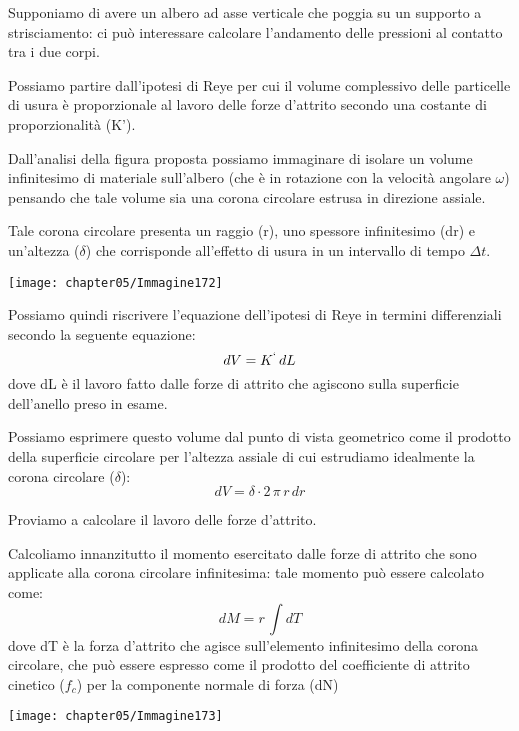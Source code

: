 Supponiamo di avere un albero ad asse verticale che poggia su un supporto a strisciamento: ci può interessare calcolare l'andamento delle pressioni al contatto tra i due corpi.

\begin{minipage}{.65\textwidth}
Possiamo partire dall'ipotesi di Reye per cui il volume complessivo delle particelle di usura è proporzionale al lavoro delle forze d'attrito secondo una costante di proporzionalità (K').

Dall'analisi della figura proposta possiamo immaginare di isolare un volume infinitesimo di materiale sull'albero (che è in rotazione con la velocità angolare $\omega$) pensando che tale volume sia una corona circolare estrusa in direzione assiale.

Tale corona circolare presenta un raggio (r), uno spessore infinitesimo (dr) e un'altezza ($\delta$) che corrisponde all'effetto di usura in un intervallo di tempo $\Delta t$.
\end{minipage}
\hfill
\begin{minipage}{.3\textwidth}
\centering
\texttt{[image: chapter05/Immagine172]}
\end{minipage}

Possiamo quindi riscrivere l'equazione dell'ipotesi di Reye in termini differenziali secondo la seguente equazione:
\[dV = K^{`}\,dL\]
dove dL è il lavoro fatto dalle forze di attrito che agiscono sulla superficie dell'anello preso in esame.

Possiamo esprimere questo volume dal punto di vista geometrico come il prodotto della superficie circolare per l'altezza assiale di cui estrudiamo idealmente la corona circolare ($\delta$):
\[dV = \delta \cdot 2\,\pi\,r\,dr\]

\begin{minipage}{.5\textwidth}
Proviamo a calcolare il lavoro delle forze d'attrito.

Calcoliamo innanzitutto il momento esercitato dalle forze di attrito che sono applicate alla corona circolare infinitesima: tale momento può essere calcolato come:
\[dM = r\,\int dT\]
dove dT è la forza d'attrito che agisce sull'elemento infinitesimo della corona circolare, che può essere espresso come il prodotto del coefficiente di attrito cinetico ($f_c$) per la componente normale di forza (dN)
\end{minipage}
\hfill
\begin{minipage}{.5\textwidth}
\centering
\texttt{[image: chapter05/Immagine173]}
\end{minipage}

